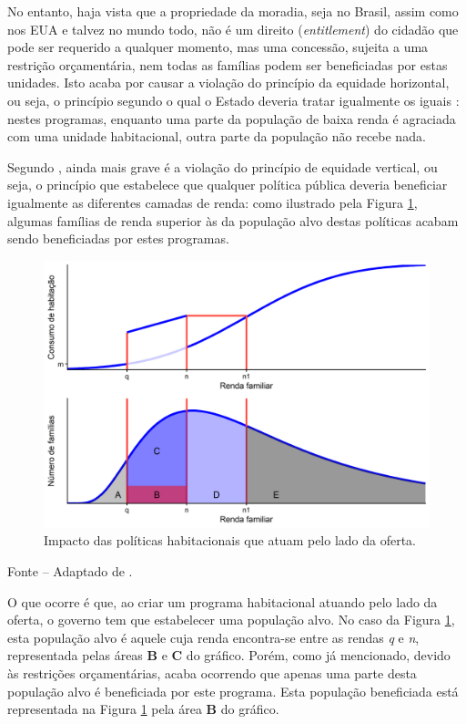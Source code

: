 \documentclass[
	12pt,				%
	oneside,			%
	a4paper,			%
	chapter=TITLE,		%
	section=TITLE,		%
	english,			%
	brazil				%
	]{abntex2}
\newcommand{\bcenter}{\begin{center}}
\newcommand{\ecenter}{\end{center}}
\begin{document}
\begin{refsection}
No entanto, haja vista que a propriedade da moradia, seja no Brasil, assim como
nos \gls{EUA} e talvez no mundo todo, não é um direito (\emph{entitlement}) do
cidadão que pode ser requerido a qualquer momento, mas uma concessão, sujeita a
uma restrição orçamentária, nem todas as famílias podem ser beneficiadas por estas
unidades. Isto acaba por causar a violação do princípio da equidade horizontal, ou
seja, o princípio segundo o qual o Estado deveria tratar igualmente os iguais
\autocite{malpezzi_affordable_2018_2}: nestes programas, enquanto uma parte da população de
baixa renda é agraciada com uma unidade habitacional, outra parte da população não
recebe nada.

Segundo \textcite[p.~263]{bertaud}, ainda mais grave é a violação do princípio de
equidade vertical, ou seja, o princípio que estabelece que qualquer política
pública deveria beneficiar igualmente as diferentes camadas de renda: como
ilustrado pela Figura \ref{fig:supplySideSubsidies}, algumas famílias de renda
superior às da população alvo destas políticas acabam sendo beneficiadas por
estes programas.
\begin{figure}[H]

{\centering \includegraphics[width=0.7\linewidth]{images/supplySideSubsidies-1} 

}

\caption{Impacto das políticas habitacionais que atuam pelo lado da oferta.}\label{fig:supplySideSubsidies}
\end{figure}
\bcenter

\small Fonte -- Adaptado de \textcite[p.~263]{bertaud}.
\ecenter

O que ocorre é que, ao criar um programa habitacional atuando pelo lado da
oferta, o governo tem que estabelecer uma população alvo. No caso da Figura
\ref{fig:supplySideSubsidies}, esta população alvo é aquele cuja renda
encontra-se entre as rendas \emph{q} e \emph{n}, representada pelas áreas \textbf{B} e \textbf{C} do
gráfico. Porém, como já mencionado, devido às restrições orçamentárias, acaba
ocorrendo que apenas uma parte desta população alvo é beneficiada por este
programa. Esta população beneficiada está representada na Figura
\ref{fig:supplySideSubsidies} pela área \textbf{B} do gráfico.


\end{refsection}
\end{document}
